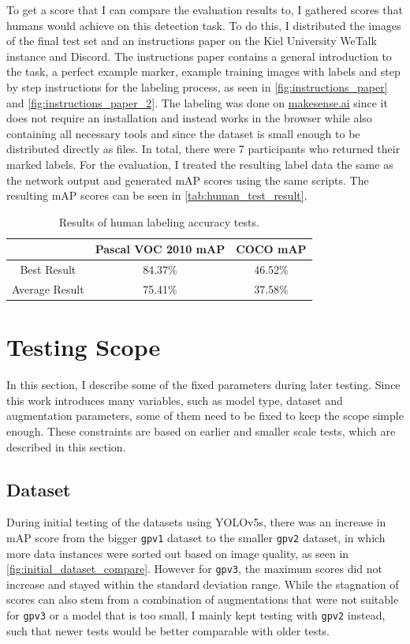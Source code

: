 \documentclass[10pt]{book}
\newcommand{\figureref}[1]{\autoref{#1}}
\begin{document}
To get a score that I can compare the evaluation results to, I gathered scores that humans would achieve on this detection task. To do this, I distributed the images of the final test set and an instructions paper on the Kiel University WeTalk instance and Discord. The instructions paper contains a general introduction to the task, a perfect example marker, example training images with labels and step by step instructions for the labeling process, as seen in \figureref{fig:instructions_paper} and \figureref{fig:instructions_paper_2}. The labeling was done on \href{https://www.makesense.ai}{makesense.ai} since it does not require an installation and instead works in the browser while also containing all necessary tools and since the dataset is small enough to be distributed directly as files. In total, there were 7 participants who returned their marked labels. For the evaluation, I treated the resulting label data the same as the network output and generated \ac{mAP} scores using the same scripts. The resulting \ac{mAP} scores can be seen in \autoref{tab:human_test_result}.

\begin{table}
  \begin{tabular}{ c c c }
   & Pascal VOC 2010 \ac{mAP} & \ac{COCO} \ac{mAP} \\ 
   \hline
   Best Result & 84.37\% & 46.52\% \\
   Average Result & 75.41\% & 37.58\% \\
   \hline
  \end{tabular}
  \caption{\label{tab:human_test_result}Results of human labeling accuracy tests.}
\end{table}

\section{Testing Scope}

In this section, I describe some of the fixed parameters during later testing. Since this work introduces many variables, such as model type, dataset and augmentation parameters, some of them need to be fixed to keep the scope simple enough. These constraints are based on earlier and smaller scale tests, which are described in this section.

\subsection{Dataset}

During initial testing of the datasets using \ac{YOLO}v5s, there was an increase in \ac{mAP} score from the bigger \texttt{gpv1} dataset to the smaller \texttt{gpv2} dataset, in which more data instances were sorted out based on image quality, as seen in \figureref{fig:initial_dataset_compare}. However for \texttt{gpv3}, the maximum scores did not increase and stayed within the standard deviation range. While the stagnation of scores can also stem from a combination of augmentations that were not suitable for \texttt{gpv3} or a model that is too small, I mainly kept testing with \texttt{gpv2} instead, such that newer tests would be better comparable with older tests. 
\end{document}
